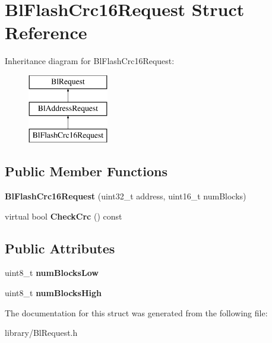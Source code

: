 \hypertarget{struct_bl_flash_crc16_request}{\section{Bl\-Flash\-Crc16\-Request Struct Reference}
\label{struct_bl_flash_crc16_request}
}
Inheritance diagram for Bl\-Flash\-Crc16\-Request\-:\begin{figure}[H]
\begin{center}
\leavevmode
\includegraphics[height=3.000000cm]{struct_bl_flash_crc16_request}
\end{center}
\end{figure}
\subsection*{Public Member Functions}
\begin{DoxyCompactItemize}
\item 
\hypertarget{struct_bl_flash_crc16_request_a19119cb8b72cd5892ee4c75d8187ce36}{{\bfseries Bl\-Flash\-Crc16\-Request} (uint32\-\_\-t address, uint16\-\_\-t num\-Blocks)}\label{struct_bl_flash_crc16_request_a19119cb8b72cd5892ee4c75d8187ce36}

\item 
\hypertarget{struct_bl_flash_crc16_request_a8758fc8e47673ffc02fd7b79596b21d9}{virtual bool {\bfseries Check\-Crc} () const }\label{struct_bl_flash_crc16_request_a8758fc8e47673ffc02fd7b79596b21d9}

\end{DoxyCompactItemize}
\subsection*{Public Attributes}
\begin{DoxyCompactItemize}
\item 
\hypertarget{struct_bl_flash_crc16_request_a9bf380a0e7aae6cb05f382c7dbf0f659}{uint8\-\_\-t {\bfseries num\-Blocks\-Low}}\label{struct_bl_flash_crc16_request_a9bf380a0e7aae6cb05f382c7dbf0f659}

\item 
\hypertarget{struct_bl_flash_crc16_request_a99771cedf57ffdd7a1933caad05c56b8}{uint8\-\_\-t {\bfseries num\-Blocks\-High}}\label{struct_bl_flash_crc16_request_a99771cedf57ffdd7a1933caad05c56b8}

\end{DoxyCompactItemize}


The documentation for this struct was generated from the following file\-:\begin{DoxyCompactItemize}
\item 
library/Bl\-Request.\-h\end{DoxyCompactItemize}
